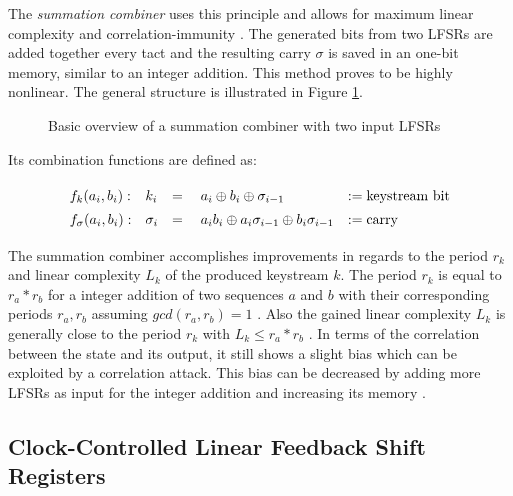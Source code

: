 The \emph{summation combiner} uses this principle and allows for maximum linear complexity and correlation-immunity \cite[p. 261]{Rueppel.1986b}. The generated bits from two LFSRs are added together every tact and the resulting carry $\sigma$ is saved in an one-bit memory, similar to an integer addition. This method proves to be highly nonlinear. The general structure is illustrated in Figure \ref{fig:summation-combiner}. \cite[p. 70]{Meier.1992} \\

\begin{figure}[htbp]
	\centering
	
	\caption{Basic overview of a summation combiner with two input LFSRs}
	\label{fig:summation-combiner}
\end{figure}

\vspace{0,7cm}

Its combination functions are defined as:

\[\def\arraystretch{1.4}\begin{array}{llll}
	f_k(a_i, b_i): & k_i &= \quad a_i \oplus b_i \oplus \sigma_{i-1} &:= \text{keystream bit}\\
	f_\sigma(a_i, b_i): & \sigma_{i} &= \quad a_ib_i \oplus a_i\sigma_{i-1} \oplus b_i\sigma_{i-1} &:= \text{carry}\\
\end{array}\]

\vspace{0,4cm}

The summation combiner accomplishes improvements in regards to the period $r_k$ and linear complexity $L_k$ of the produced keystream $k$. The period $r_k$ is equal to $r_a*r_b$ for a integer addition of two sequences $a$ and $b$ with their corresponding periods $r_a, r_b$ assuming $gcd(r_a,r_b)=1$ \cite[p. 220]{Rueppel.1986}. Also the gained linear complexity $L_k$ is generally close to the period $r_k$ with $L_k \leq r_a*r_b$ \cite[p. 225]{Rueppel.1986}. In terms of the correlation between the state and its output, it still shows a slight bias which can be exploited by a correlation attack. This bias can be decreased by adding more LFSRs as input for the integer addition and increasing its memory \cite[pp. 81-82]{Meier.1992}. \\

\subsection{Clock-Controlled Linear Feedback Shift Registers}


